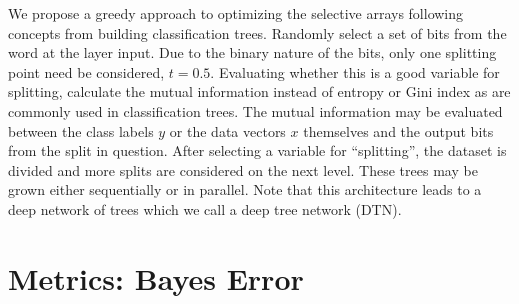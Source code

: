 \documentclass{article}
\begin{document}
We propose a greedy approach to optimizing the selective arrays following concepts from building classification trees.  Randomly select a set of bits from the word at the layer input.  Due to the binary nature of the bits, only one splitting point need be considered, $t=0.5$.  Evaluating whether this is a good variable for splitting, calculate the mutual information instead of entropy or Gini index as are commonly used in classification trees.  The mutual information may be evaluated between the class labels $y$ or the data vectors $x$ themselves and the output bits from the split in question.  After selecting a variable for ``splitting'', the dataset is divided and more splits are considered on the next level.  These trees may be grown either sequentially or in parallel.  Note that this architecture leads to a deep network of trees which we call a deep tree network (DTN).

\section{Metrics: Bayes Error}
\end{document}
